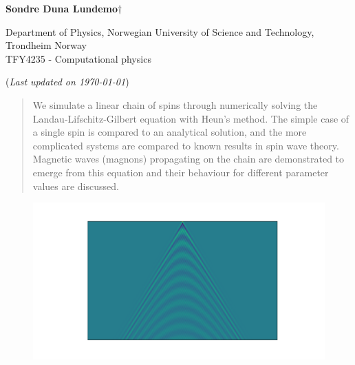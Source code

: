 


	
\begin{titlepage}
	\begin{center}
	\setlength{\parskip}{0em}
	\thispagestyle{titlepage}
	

	\vspace{4mm}
	
	\large{\textbf{Sondre Duna Lundemo}}$\dagger$
	
	\normalsize{Department of Physics, Norwegian University of Science and Technology, Trondheim Norway \\
	TFY4235 - Computational physics
	}

	(\textit{Last updated on \today})
	\end{center}

	\setlength{\parindent}{2em}
		\begin{abstract}
		We simulate a linear chain of spins through numerically solving the Landau-Lifschitz-Gilbert equation with Heun's method. The simple case of a single spin is compared to an analytical solution, and the more complicated systems are compared to known results in spin wave theory. Magnetic waves (magnons) propagating on the chain are demonstrated to emerge from this equation and their behaviour for different parameter values are discussed.
		\end{abstract}
	\begin{figure}[htb]
		\centering
		\includegraphics[width=\columnwidth]{../fig/front_fig.pdf}
	\end{figure}
	

\end{titlepage}

\newpage
\setlength{\parskip}{0em}
\tableofcontents
\setlength{\parskip}{1em}
\newpage

